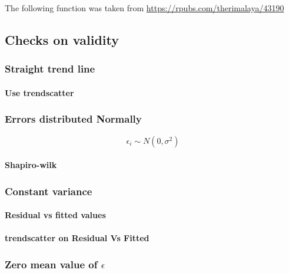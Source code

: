 \documentclass[]{article}
\let\oldparagraph\paragraph
\renewcommand{\paragraph}[1]{\oldparagraph{#1}\mbox{}}
\begin{document}
The following function was taken from
\url{https://rpubs.com/therimalaya/43190}

\subsection{Checks on validity}\label{checks-on-validity}

\subsubsection{Straight trend line}\label{straight-trend-line}

\paragraph{Use trendscatter}\label{use-trendscatter}

\subsubsection{Errors distributed
Normally}\label{errors-distributed-normally}

\[\epsilon_i \sim N(0,\sigma^2)\]

\paragraph{Shapiro-wilk}\label{shapiro-wilk}

\subsubsection{Constant variance}\label{constant-variance}

\paragraph{Residual vs fitted values}\label{residual-vs-fitted-values}

\paragraph{trendscatter on Residual Vs
Fitted}\label{trendscatter-on-residual-vs-fitted}

\subsubsection{\texorpdfstring{Zero mean value of
\(\epsilon\)}{Zero mean value of \textbackslash{}epsilon}}\label{zero-mean-value-of-epsilon}
\end{document}

